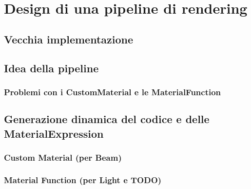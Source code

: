 \documentclass[main.tex]{subfiles}
\begin{document}
\sloppy


\vspace{1.0cm}

\section{Design di una pipeline di rendering}\label{sec:RenderingPipeline}

\subsection{Vecchia implementazione}\label{subsec:2_oldImplementation}

\subsection{Idea della pipeline}\label{subsec:2_pipelineIdea}
\subsubsection{Problemi con i CustomMaterial e le MaterialFunction}\label{subsec:2_2_CM-MFproblems}

\subsection{Generazione dinamica del codice e delle MaterialExpression}\label{subsec:2_codeGeneration}
\subsubsection{Custom Material (per Beam)}\label{subsec:2_3_CM}
\subsubsection{Material Function (per Light e TODO)}\label{subsec:2_3_MF}
\end{document}
